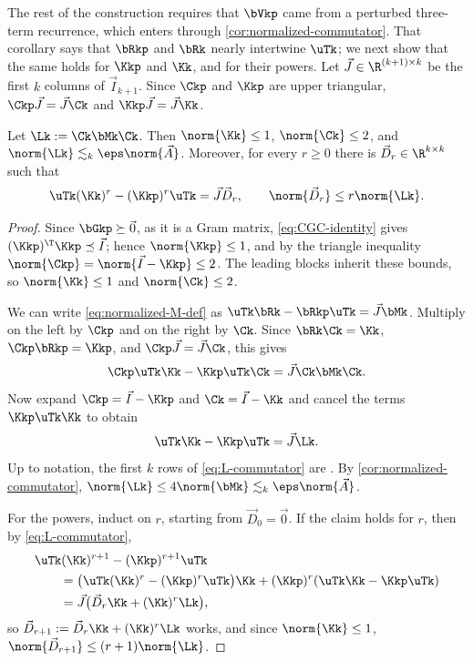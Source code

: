 The rest of the construction requires that \(\bVkp\) came from a perturbed three-term recurrence, which enters through \cref{cor:normalized-commutator}.
That corollary says that \(\bRkp\) and \(\bRk\) nearly intertwine \(\uTk\); we next show that the same holds for \(\Kkp\) and \(\Kk\), and for their powers.
Let \(\vec J\in\R^{(k+1)\times k}\) be the first \(k\) columns of \(\vec I_{k+1}\).
Since \(\Ckp\) and \(\Kkp\) are upper triangular, \(\Ckp\vec J=\vec J\Ck\) and \(\Kkp\vec J=\vec J\Kk\).

\begin{lemma}
\label{lem:exchange}
Let \(\Lk:=\Ck\bMk\Ck\).
Then \(\norm{\Kk}\le1\), \(\norm{\Ck}\le2\), and \(\norm{\Lk}\lesssim_k\eps\norm{\vec A}\).
Moreover, for every \(r\ge0\) there is \(\vec D_r\in\R^{k\times k}\) such that
\[
 \uTk(\Kk)^r-(\Kkp)^r\uTk=\vec J\vec D_r,
 \qquad
 \norm{\vec D_r}\le r\norm{\Lk}.
\]
\end{lemma}

\begin{proof}
Since \(\bGkp\succeq\vec0\), as it is a Gram matrix, \cref{eq:CGC-identity} gives \((\Kkp)^\T\Kkp\preceq\vec I\); hence \(\norm{\Kkp}\le1\), and by the triangle inequality \(\norm{\Ckp}=\norm{\vec I-\Kkp}\le2\).
The leading blocks inherit these bounds, so \(\norm{\Kk}\le1\) and \(\norm{\Ck}\le2\).

We can write \cref{eq:normalized-M-def} as \(\uTk\bRk-\bRkp\uTk=\vec J\bMk\).
Multiply on the left by \(\Ckp\) and on the right by \(\Ck\).
Since \(\bRk\Ck=\Kk\), \(\Ckp\bRkp=\Kkp\), and \(\Ckp\vec J=\vec J\Ck\), this gives
\[
 \Ckp\uTk\Kk-\Kkp\uTk\Ck=\vec J\Ck\bMk\Ck.
\]
Now expand \(\Ckp=\vec I-\Kkp\) and \(\Ck=\vec I-\Kk\) and cancel the terms \(\Kkp\uTk\Kk\) to obtain
\begin{equation}
 \uTk\Kk-\Kkp\uTk=\vec J\Lk.
 \label{eq:L-commutator}
\end{equation}
Up to notation, the first \(k\) rows of \cref{eq:L-commutator} are \cite[eq.~(3.9)]{paige2010}.
By \cref{cor:normalized-commutator}, \(\norm{\Lk}\le4\norm{\bMk}\lesssim_k\eps\norm{\vec A}\).

For the powers, induct on \(r\), starting from \(\vec D_0=\vec0\).
If the claim holds for \(r\), then by \cref{eq:L-commutator},
\begin{align*}
 &\uTk(\Kk)^{r+1}-(\Kkp)^{r+1}\uTk
 \\
 &\qquad=\bigl(\uTk(\Kk)^r-(\Kkp)^r\uTk\bigr)\Kk+(\Kkp)^r(\uTk\Kk-\Kkp\uTk)
 \\
 &\qquad=\vec J\bigl(\vec D_r\Kk+(\Kk)^r\Lk\bigr),
\end{align*}
so \(\vec D_{r+1}:=\vec D_r\Kk+(\Kk)^r\Lk\) works, and since \(\norm{\Kk}\le1\), \(\norm{\vec D_{r+1}}\le(r+1)\norm{\Lk}\).
\end{proof}

